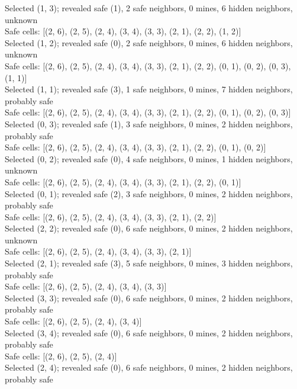 \documentclass[11pt]{article} %
\begin{document}
Selected (1, 3); revealed safe (1), 2 safe neighbors, 0 mines, 6 hidden neighbors, unknown\\
Safe cells: [(2, 6), (2, 5), (2, 4), (3, 4), (3, 3), (2, 1), (2, 2), (1, 2)]\\
Selected (1, 2); revealed safe (0), 2 safe neighbors, 0 mines, 6 hidden neighbors, unknown\\
Safe cells: [(2, 6), (2, 5), (2, 4), (3, 4), (3, 3), (2, 1), (2, 2), (0, 1), (0, 2), (0, 3), (1, 1)]\\
Selected (1, 1); revealed safe (3), 1 safe neighbors, 0 mines, 7 hidden neighbors, probably safe\\
Safe cells: [(2, 6), (2, 5), (2, 4), (3, 4), (3, 3), (2, 1), (2, 2), (0, 1), (0, 2), (0, 3)]\\
Selected (0, 3); revealed safe (1), 3 safe neighbors, 0 mines, 2 hidden neighbors, probably safe\\
Safe cells: [(2, 6), (2, 5), (2, 4), (3, 4), (3, 3), (2, 1), (2, 2), (0, 1), (0, 2)]\\
Selected (0, 2); revealed safe (0), 4 safe neighbors, 0 mines, 1 hidden neighbors, unknown\\
Safe cells: [(2, 6), (2, 5), (2, 4), (3, 4), (3, 3), (2, 1), (2, 2), (0, 1)]\\
Selected (0, 1); revealed safe (2), 3 safe neighbors, 0 mines, 2 hidden neighbors, probably safe\\
Safe cells: [(2, 6), (2, 5), (2, 4), (3, 4), (3, 3), (2, 1), (2, 2)]\\
Selected (2, 2); revealed safe (0), 6 safe neighbors, 0 mines, 2 hidden neighbors, unknown\\
Safe cells: [(2, 6), (2, 5), (2, 4), (3, 4), (3, 3), (2, 1)]\\
Selected (2, 1); revealed safe (3), 5 safe neighbors, 0 mines, 3 hidden neighbors, probably safe\\
Safe cells: [(2, 6), (2, 5), (2, 4), (3, 4), (3, 3)]\\
Selected (3, 3); revealed safe (0), 6 safe neighbors, 0 mines, 2 hidden neighbors, probably safe\\
Safe cells: [(2, 6), (2, 5), (2, 4), (3, 4)]\\
Selected (3, 4); revealed safe (0), 6 safe neighbors, 0 mines, 2 hidden neighbors, probably safe\\
Safe cells: [(2, 6), (2, 5), (2, 4)]\\
Selected (2, 4); revealed safe (0), 6 safe neighbors, 0 mines, 2 hidden neighbors, probably safe\\
\end{document}
